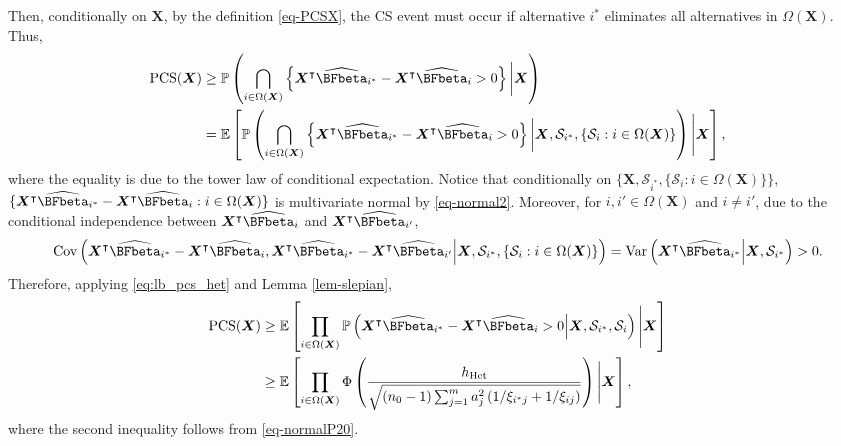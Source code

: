 \documentclass[ijoc,nonblindrev]{informs3}
\def\E{\mathbb{E}}
\def\Var{{\rm Var}}
\def\Cov{{\rm Cov}}
\def\pr{\mathbb{P}}
\def\bX{{\bm X}}
\def\hhet{h_{\mathrm{Het}}}
\begin{document}
Then, conditionally on $\bX$, by the definition \eqref{eq-PCSX}, the CS event must occur if alternative $i^*$ eliminates all alternatives in $\Omega(\bX)$.
Thus,
\begin{align}\label{eq:lb_pcs_het}
\mathrm{PCS}(\bX) & \geq \pr \left( \bigcap_{i\in\Omega(\bX)} \left\{ \bX^\intercal \widehat{\BFbeta}_{i^*} - \bX^\intercal \widehat{\BFbeta}_i  > 0 \right\} \bigg| \bX \right) \nonumber\\
& = \E \left[ \pr \left( \bigcap_{i\in\Omega(\bX)} \left\{ \bX^\intercal \widehat{\BFbeta}_{i^*} - \bX^\intercal \widehat{\BFbeta}_i  > 0 \right\} \bigg| \bX, \mathcal{S}_{i^*}, \left\{\mathcal{S}_i: i \in \Omega(\bX) \right\} \right) \Bigg| \bX \right],
\end{align}
where the equality is due to the tower law of conditional expectation.
Notice that  conditionally on $\{\bX, \mathcal{S}_{i^*}, \{ \mathcal{S}_i: i\in\Omega(\bX)\} \}$, $\{ \bX^\intercal \widehat{\BFbeta}_{i^*} - \bX^\intercal \widehat{\BFbeta}_i: i\in\Omega(\bX) \}$ is multivariate normal by \eqref{eq-normal2}.
Moreover, for $i,i' \in \Omega(\bX)$ and $i \neq i'$, due to the conditional independence between $\bX^\intercal \widehat{\BFbeta}_i$  and  $\bX^\intercal \widehat{\BFbeta}_{i'}$,
\[\Cov\left(\bX^\intercal \widehat{\BFbeta}_{i^*} - \bX^\intercal \widehat{\BFbeta}_i, \bX^\intercal \widehat{\BFbeta}_{i^*} - \bX^\intercal \widehat{\BFbeta}_{i'} \Big| \bX,\mathcal S_{i^*}, \{ \mathcal{S}_i: i\in\Omega(\bX)\} \right)= \Var\left(\bX^\intercal \widehat{\BFbeta}_{i^*} \Big| \bX, \mathcal S_{i^*}\right)>0.\]
Therefore, applying  \eqref{eq:lb_pcs_het} and Lemma \ref{lem-slepian},
\begin{align}
\mathrm{PCS}(\bX) &\geq \E \left[ \prod_{i\in\Omega(\bX)} \pr \left( \bX^\intercal \widehat{\BFbeta}_{i^*} - \bX^\intercal \widehat{\BFbeta}_i  > 0 \Big| \bX, \mathcal S_{i^*}, \mathcal{S}_i\right)  \Bigg| \bX \right]  \nonumber\\
&\geq \E \left[ \prod_{i\in\Omega(\bX)}  \Phi \left(\frac{\hhet} { \sqrt{ (n_0-1) \sum_{j=1}^m a_j^2 \left( 1/\xi_{i^*j} + 1/\xi_{ij} \right)} } \right) \Bigg| \bX \right], \label{eq:lb_pcs_het2}
\end{align}
where the second inequality follows from \eqref{eq-normalP20}.
\end{document}

